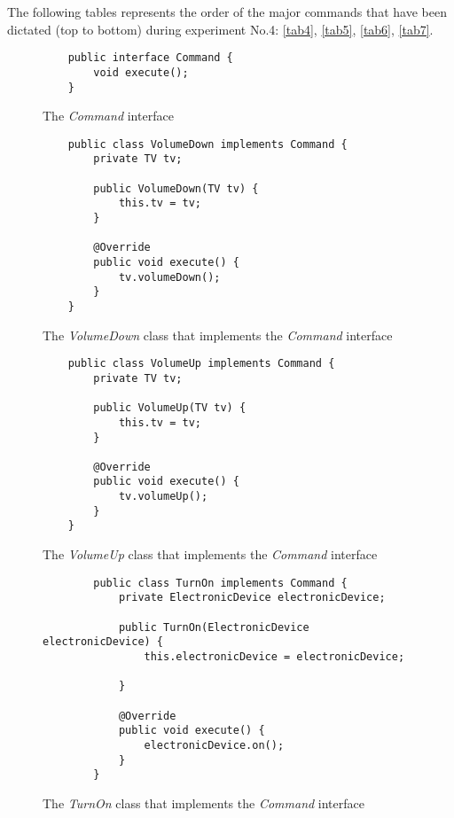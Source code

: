The following tables represents the order of the major commands that have been dictated (top to bottom) during experiment No.4: \autoref{tab4}, \autoref{tab5}, \autoref{tab6}, \autoref{tab7}.
\begin{figure}[H]
	\begin{lstlisting}
	public interface Command {
		void execute();
	}
	\end{lstlisting}
	\caption{The \textit{Command} interface}
	\label{fig7}
\end{figure}
\begin{figure}[H]
	\begin{lstlisting}
	public class VolumeDown implements Command {
		private TV tv;
		
		public VolumeDown(TV tv) {
			this.tv = tv;
		}
		
		@Override
		public void execute() {
			tv.volumeDown();
		}
	}
	\end{lstlisting}
	\caption{The \textit{VolumeDown} class that implements the \textit{Command} interface}
	\label{fig8}
\end{figure}
\begin{figure}[H]
	\begin{lstlisting}
	public class VolumeUp implements Command {
		private TV tv;
		
		public VolumeUp(TV tv) {
			this.tv = tv;
		}
		
		@Override
		public void execute() {
			tv.volumeUp();
		}
	}
	\end{lstlisting}
	\caption{The \textit{VolumeUp} class that implements the \textit{Command} interface}
	\label{fig9}
\end{figure}
\begin{figure}[H]
	\begin{lstlisting}
		public class TurnOn implements Command {
			private ElectronicDevice electronicDevice;
			
			public TurnOn(ElectronicDevice electronicDevice) {
				this.electronicDevice = electronicDevice;
			
			}
			
			@Override
			public void execute() {
				electronicDevice.on();
			}
		}
	\end{lstlisting}
	\caption{The \textit{TurnOn} class that implements the \textit{Command} interface}
	\label{fig10}
\end{figure}

